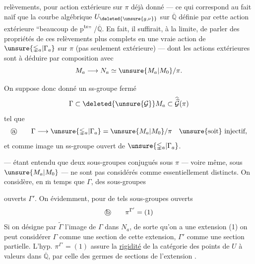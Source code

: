 
 relèvements, pour  action extérieure sur $\pi$ déjà donné --- ce qui correspond au fait naïf que la courbe algébrique $U_{\deleted{\unsure{g,\nu}}}$ sur $\overline{\mathbb Q}$ définie par cette action extérieure  ``beaucoup de p\textsuperscript{ts}'' /$\overline{\mathbb Q}$. En fait, il suffirait, à la limite, de parler des  propriétés de ces relèvements plus complets en une vraie action de  $\unsure{\mathbb{\Gamma}_a|\Gamma_a}$ sur $\pi$ (pas seulement extérieure) --- dont les actions extérieures sont à déduire par composition avec
\[
M_a \longrightarrow N_a \simeq \unsure{M_a|M_0}/\pi.
\]

 On suppose donc donné un ss-groupe fermé
\[
\Gamma \subset \deleted{\unsure{\mathcal G}} M_a \subset \widehat{\widehat{\mathcal G}}(\pi)
\]
tel que
\[
\text{\textcircled{a}}\qquad
\Gamma \longrightarrow \unsure{\mathbb{\Gamma}_a|\Gamma_a}
 = \unsure{M_a|M_0}/\pi
\quad \text{\unsure{soit} injectif,}
\]
et  comme image un ss-groupe ouvert de $\unsure{\mathbb{\Gamma}_a|\Gamma_a}$.

--- étant entendu que deux sous-groupes conjugués sous $\pi$ --- voire même,  sous $\unsure{M_a|M_0}$ --- ne sont pas considérés comme essentiellement distincts. On considère, en $\overline{\mathrm m}$ temps que $\Gamma$, des sous-groupes


ouverts $\Gamma'$. On  évidemment, pour de tels sous-groupes ouverts
\[
\text{\textcircled{b}}\qquad \pi^{\Gamma'}=(1)
\]
Si on désigne par $\widetilde{\Gamma}$ l'image de $\Gamma$ dans $N_a$, de sorte qu'on a une extension
(1)\quad
{}
on peut considérer $\Gamma$ comme une section de cette extension, $\Gamma'$ comme une section partielle. L'hyp. $\pi^{\Gamma'}=(1)$ assure la \uline{rigidité} de la catégorie des points de $U$ à valeurs dans $\overline{\mathbb Q}$,  par celle des germes de sections de l'extension .

